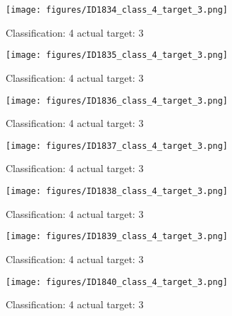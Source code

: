 \begin{figure}[h!]
\begin{center}
\texttt{[image: figures/ID1834\_class\_4\_target\_3.png]}
\end{center}
\caption{ Classification: 4 actual target: 3}
\label{fig:ID1834_class_4_target_3}
\end{figure}
\begin{figure}[h!]
\begin{center}
\texttt{[image: figures/ID1835\_class\_4\_target\_3.png]}
\end{center}
\caption{ Classification: 4 actual target: 3}
\label{fig:ID1835_class_4_target_3}
\end{figure}
\begin{figure}[h!]
\begin{center}
\texttt{[image: figures/ID1836\_class\_4\_target\_3.png]}
\end{center}
\caption{ Classification: 4 actual target: 3}
\label{fig:ID1836_class_4_target_3}
\end{figure}
\begin{figure}[h!]
\begin{center}
\texttt{[image: figures/ID1837\_class\_4\_target\_3.png]}
\end{center}
\caption{ Classification: 4 actual target: 3}
\label{fig:ID1837_class_4_target_3}
\end{figure}
\begin{figure}[h!]
\begin{center}
\texttt{[image: figures/ID1838\_class\_4\_target\_3.png]}
\end{center}
\caption{ Classification: 4 actual target: 3}
\label{fig:ID1838_class_4_target_3}
\end{figure}
\begin{figure}[h!]
\begin{center}
\texttt{[image: figures/ID1839\_class\_4\_target\_3.png]}
\end{center}
\caption{ Classification: 4 actual target: 3}
\label{fig:ID1839_class_4_target_3}
\end{figure}
\begin{figure}[h!]
\begin{center}
\texttt{[image: figures/ID1840\_class\_4\_target\_3.png]}
\end{center}
\caption{ Classification: 4 actual target: 3}
\label{fig:ID1840_class_4_target_3}
\end{figure}

